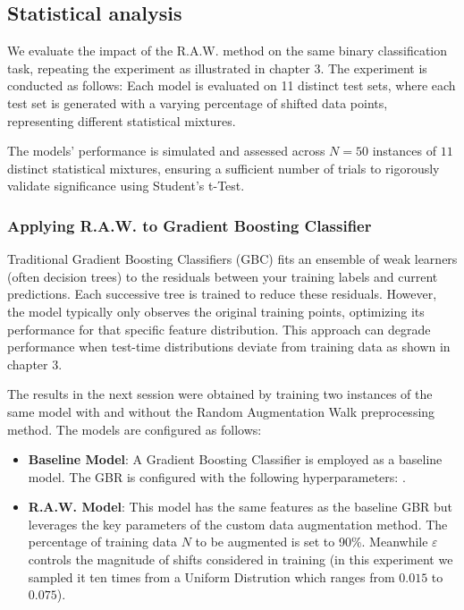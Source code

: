 \subsection{Statistical analysis}

We evaluate the impact of the R.A.W. method on the same binary classification task, repeating the experiment as illustrated in chapter 3. The experiment is conducted as follows:
Each model is evaluated on 11 distinct test sets, where each test set is generated with a varying percentage of shifted data points, representing different statistical mixtures.

The models' performance is simulated and assessed across $N=50$ instances of $11$ distinct statistical mixtures, ensuring a sufficient number of trials to rigorously validate significance using Student's t-Test.

\subsubsection{Applying R.A.W. to Gradient Boosting Classifier}

Traditional Gradient Boosting Classifiers (GBC) fits an ensemble of weak learners (often decision trees) to the residuals between your training labels and current predictions. Each successive tree is trained to reduce these residuals. However, the model typically only observes the original training points, optimizing its performance for that specific feature distribution. This approach can degrade performance when test-time distributions deviate from training data as shown in chapter 3. 

The results in the next session were obtained by training two instances of the same model with and without the Random Augmentation Walk preprocessing method. The models are configured as follows:
\begin{itemize}
    \item \textbf{Baseline Model}: A Gradient Boosting Classifier is employed as a baseline model. The GBR is configured with the following hyperparameters: .
    \item \textbf{R.A.W. Model}: This model has the same features as the baseline GBR but leverages the key parameters of the custom data augmentation method. The percentage of training data $N$ to be augmented is set to 90\%. Meanwhile $\varepsilon$ controls the magnitude of shifts considered in training (in this experiment we sampled it ten times from a Uniform Distrution which ranges from $0.015$ to $0.075$).
\end{itemize}

